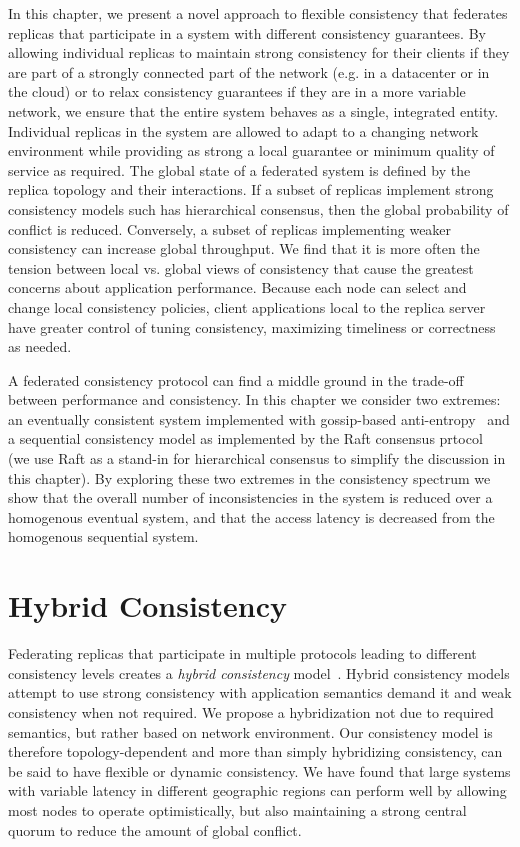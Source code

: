 In this chapter, we present a novel approach to flexible consistency that federates replicas that participate in a system with different consistency guarantees.
By allowing individual replicas to maintain strong consistency for their clients if they are part of a strongly connected part of the network (e.g. in a datacenter or in the cloud) or to relax consistency guarantees if they are in a more variable network, we ensure that the entire system behaves as a single, integrated entity.
Individual replicas in the system are allowed to adapt to a changing network environment while providing as strong a local guarantee or minimum quality of service as required.
The global state of a federated system is defined by the replica topology and their interactions.
If a subset of replicas implement strong consistency models such has hierarchical consensus, then the global probability of conflict is reduced.
Conversely, a subset of replicas implementing weaker consistency can increase global throughput.
We find that it is more often the tension between local vs. global views of consistency that cause the greatest concerns about application performance.
Because each node can select and change local consistency policies, client applications local to the replica server have greater control of tuning consistency, maximizing timeliness or correctness as needed.

A federated consistency protocol can find a middle ground in the trade-off between performance and consistency.
In this chapter we consider two extremes: an eventually consistent system implemented with gossip-based anti-entropy~\cite{anti_entropy,dynamo} and a sequential consistency model as implemented by the Raft consensus prtocol~\cite{raft} (we use Raft as a stand-in for hierarchical consensus to simplify the discussion in this chapter).
By exploring these two extremes in the consistency spectrum we show that the overall number of inconsistencies in the system is reduced over a homogenous eventual system, and that the access latency is decreased from the homogenous sequential system.

\section{Hybrid Consistency}
\label{ch04_hybrid_consistency}

Federating replicas that participate in multiple protocols leading to different consistency levels creates a \emph{hybrid consistency} model~\cite{hybrid_consistency}.
Hybrid consistency models attempt to use strong consistency with application semantics demand it and weak consistency when not required.
We propose a hybridization not due to required semantics, but rather based on network environment.
Our consistency model is therefore topology-dependent and more than simply hybridizing consistency, can be said to have flexible or dynamic consistency.
We have found that large systems with variable latency in different geographic regions can perform well by allowing most nodes to operate optimistically, but also maintaining a strong central quorum to reduce the amount of global conflict.

